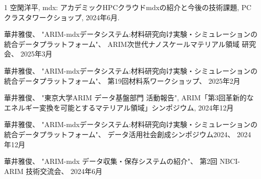 \begin{招待講演}{1}
空閑洋平, mdx: アカデミックHPCクラウドmdxの紹介と今後の技術課題, PCクラスタワークショップ, 2024年6月.

華井雅俊、 
"ARIM-mdxデータシステム:材料研究向け実験・シミュレーションの統合データプラットフォーム"、
ARIM次世代ナノスケールマテリアル領域 研究会、
2025年3月

華井雅俊、 
"ARIM-mdxデータシステム:材料研究向け実験・シミュレーションの統合データプラットフォーム"、
第19回材料系ワークショップ、
2025年2月

華井雅俊、
"東京大学ARIM データ基盤部門 活動報告",
ARIM「第3回革新的なエネルギー変換を可能とするマテリアル領域」シンポジウム,
2024年12月

華井雅俊、
"ARIM-mdxデータシステム:材料研究向け実験・シミュレーションの統合データプラットフォーム"、
データ活用社会創成シンポジウム2024、
2024年12月

華井雅俊、 
"ARIM-mdx データ収集・保存システムの紹介"、
第2回 NBCI-ARIM 技術交流会、
2024年6月

\end{招待講演}








